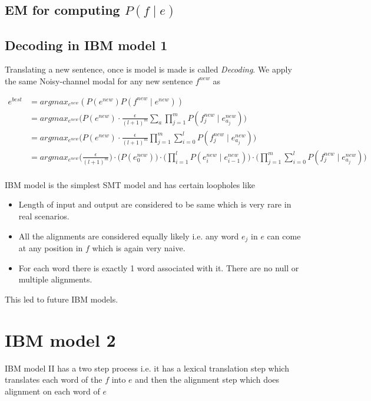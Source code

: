 \subsection{EM for computing $P(f\mid e)$}
\subsection{Decoding in IBM model 1}
Translating a new sentence, once is model is made is called \textit{Decoding}. We apply the same Noisy-channel modal for any new sentence $f^{new}$ as

\begin{align*}
e^{best} &= argmax_{e^{new}}(P(e^{new})P(f^{new}\mid e^{new}))\\
         &= argmax_{e^{new}}\Bigg(P(e^{new})\cdot \frac{\epsilon}{(l+1)^{m}}\sum_{a}\prod_{j=1}^{m}P(f_{j}^{new}\mid e_{a_{j}}^{new})\Bigg) \\
         &= argmax_{e^{new}}\Bigg(P(e^{new})\cdot \frac{\epsilon}{(l+1)^{m}}\prod_{j=1}^{m}\sum_{i=0}^{l}P(f_{j}^{new}\mid e_{a_{j}}^{new})\Bigg) \\
         &= argmax_{e^{new}}\Bigg(\frac{\epsilon}{(l+1)^{m}}\Bigg)\cdot \big(P(e_{0}^{new}) \big)\cdot \Bigg(\prod_{i=1}^{l}P(e_{i}^{new}\mid e_{i-1}^{new})\Bigg)\cdot \Bigg(\prod_{j=1}^{m}\sum_{i=0}^{l}P(f_{j}^{new}\mid e_{a_{j}}^{new})\Bigg) \\ 
\end{align*}

IBM model is the simplest SMT model and has certain loopholes like
\begin{itemize}
\item Length of input and output are considered to be same which is very rare in real scenarios.
\item All the alignments are considered equally likely i.e. any word $e_{j}$ in $e$ can come at any position in $f$ which is again very naive.
\item For each word there is exactly 1 word associated with it. There are no null or multiple alignments.
\end{itemize}

This led to future IBM models.

\section{IBM model 2}
IBM model II has a two step process i.e. it has a lexical translation step which translates each word of the $f$ into $e$ and then the alignment step which does alignment on each word of $e$
